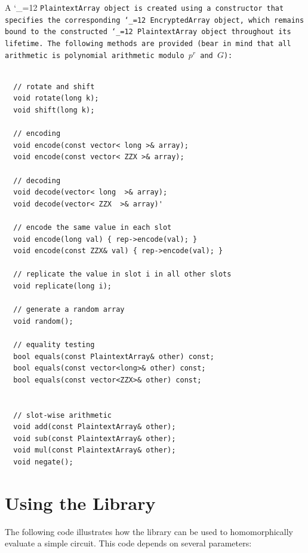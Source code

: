 \documentclass[14pt]{extarticle}
\def\class{%
\begingroup\catcode`\_=12\relax
\classwitharg}
\def\classwitharg#1{\tt #1\endgroup}
\begin{document}
A \class{PlaintextArray} object is created using a constructor
that specifies the corresponding \class{EncryptedArray}
object, which remains bound to the constructed \class{PlaintextArray}
object throughout its lifetime.
The following methods are provided (bear in mind that all
arithmetic is polynomial arithmetic modulo $p^r$ and $G$):
\begin{verbatim}

  // rotate and shift
  void rotate(long k);
  void shift(long k);

  // encoding
  void encode(const vector< long >& array);
  void encode(const vector< ZZX >& array);

  // decoding
  void decode(vector< long  >& array);
  void decode(vector< ZZX  >& array)'

  // encode the same value in each slot
  void encode(long val) { rep->encode(val); }
  void encode(const ZZX& val) { rep->encode(val); }

  // replicate the value in slot i in all other slots
  void replicate(long i);

  // generate a random array
  void random();

  // equality testing
  bool equals(const PlaintextArray& other) const;
  bool equals(const vector<long>& other) const;
  bool equals(const vector<ZZX>& other) const;


  // slot-wise arithmetic
  void add(const PlaintextArray& other);
  void sub(const PlaintextArray& other);
  void mul(const PlaintextArray& other);
  void negate();
\end{verbatim}



\section{Using the Library}\label{sec:using}
The following code illustrates how the library can be used to
homomorphically evaluate a simple circuit. This code depends on
several parameters:
\end{document}
